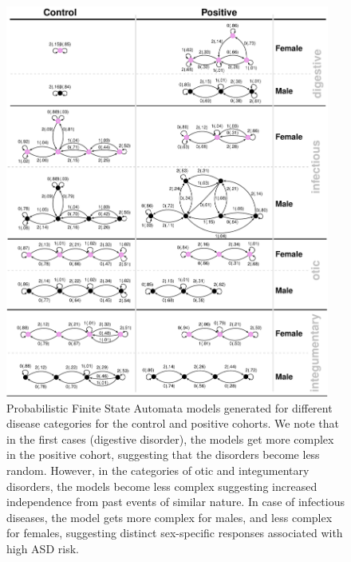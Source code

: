 \documentclass[onecolumn,,10pt]{IEEEtran}
\renewcommand{\captionN}[1]{\caption{\color{CadetBlue4!80!black} \sffamily \fontsize{9}{10}\selectfont #1  }}
\newif\iftikzX
\gdef\treatment{positive\xspace}
\begin{document}
\begin{figure}[!t]
  \tikzexternalenable
  \centering  
  \vspace{-10pt}
  
 \def\DATA{../../data_latest}
\iftikzX

\else
  \includegraphics[width=0.95\textwidth]{Figures/External/pfsa}
  \fi
      \vspace{-5pt}

     \captionN{Probabilistic Finite State Automata models generated for different disease categories for the control and \treatment cohorts. We note that in the first  cases (digestive disorder), the models get more complex in the \treatment cohort, suggesting that the disorders become less random. However, in the categories of otic and integumentary disorders, the models become less complex suggesting increased independence from past events of similar nature. In case of infectious diseases, the model gets more complex for males, and less complex for females, suggesting distinct sex-specific responses associated with high ASD risk.}\label{EXT-autgrid}
\end{figure}
\else
{}\label{EXT-autgrid}
\fi
\end{document}
